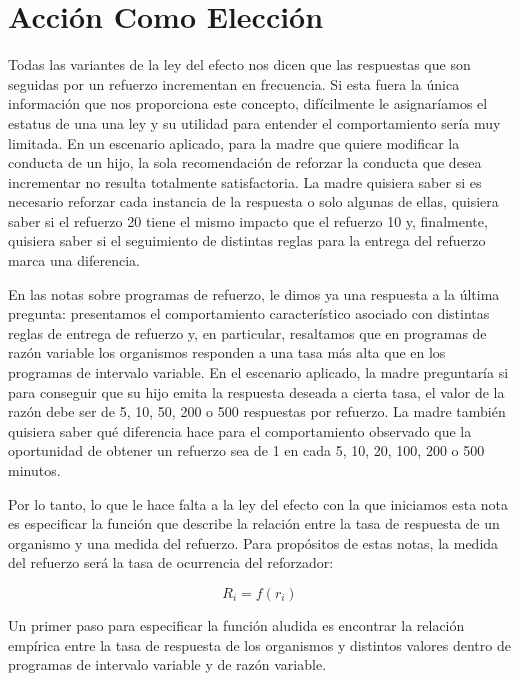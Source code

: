 \documentclass[
  letterpaper,
]{book}
\begin{document}

\chapter{Acción Como Elección}\label{acciuxf3n-como-elecciuxf3n}

Todas las variantes de la ley del efecto nos dicen que las respuestas
que son seguidas por un refuerzo incrementan en frecuencia. Si esta
fuera la única información que nos proporciona este concepto,
difícilmente le asignaríamos el estatus de una una ley y su utilidad
para entender el comportamiento sería muy limitada. En un escenario
aplicado, para la madre que quiere modificar la conducta de un hijo, la
sola recomendación de reforzar la conducta que desea incrementar no
resulta totalmente satisfactoria. La madre quisiera saber si es
necesario reforzar cada instancia de la respuesta o solo algunas de
ellas, quisiera saber si el refuerzo 20 tiene el mismo impacto que el
refuerzo 10 y, finalmente, quisiera saber si el seguimiento de distintas
reglas para la entrega del refuerzo marca una diferencia.

En las notas sobre programas de refuerzo, le dimos ya una respuesta a la
última pregunta: presentamos el comportamiento característico asociado
con distintas reglas de entrega de refuerzo y, en particular, resaltamos
que en programas de razón variable los organismos responden a una tasa
más alta que en los programas de intervalo variable. En el escenario
aplicado, la madre preguntaría si para conseguir que su hijo emita la
respuesta deseada a cierta tasa, el valor de la razón debe ser de 5, 10,
50, 200 o 500 respuestas por refuerzo. La madre también quisiera saber
qué diferencia hace para el comportamiento observado que la oportunidad
de obtener un refuerzo sea de 1 en cada 5, 10, 20, 100, 200 o 500
minutos.

Por lo tanto, lo que le hace falta a la ley del efecto con la que
iniciamos esta nota es especificar la función que describe la relación
entre la tasa de respuesta de un organismo y una medida del refuerzo.
Para propósitos de estas notas, la medida del refuerzo será la tasa de
ocurrencia del reforzador:

\[R_i = f (r_i)\]

Un primer paso para especificar la función aludida es encontrar la
relación empírica entre la tasa de respuesta de los organismos y
distintos valores dentro de programas de intervalo variable y de razón
variable.
\end{document}

